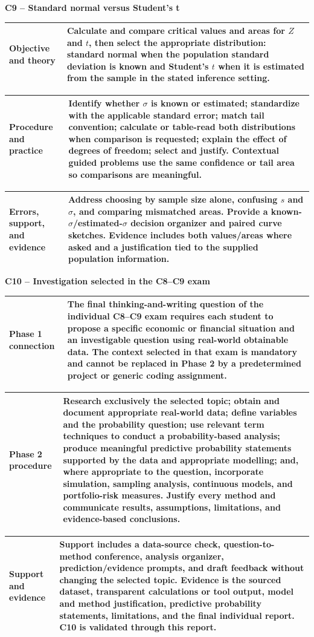 \documentclass[10pt,letterpaper]{article}
\newcommand{\criterionpart}[1]{%
	\Needspace{10\baselineskip}\par\vspace{5pt}%
	\begin{tcolorbox}[
		colback=sectionblue!7,
		colframe=borderblue,
		boxrule=0.8pt,
		sharp corners,
		left=6pt,right=6pt,top=3pt,bottom=3pt,
		before skip=0pt,after skip=2pt]
		\bfseries #1
	\end{tcolorbox}%
}
\newcommand{\labelled}[2]{%
	\noindent
	\begin{tabularx}{\textwidth}{|>{\RaggedRight\arraybackslash\bfseries}p{2.12in}|>{\RaggedRight\arraybackslash}X|}
		\hline
		#1 & #2\\
		\hline
	\end{tabularx}\par\vspace{-\arrayrulewidth}%
}
\begin{document}
\criterionpart{C9 -- Standard normal versus Student's t}
\labelled{Objective and theory}{Calculate and compare critical values and areas for $Z$ and $t$, then select the appropriate distribution: standard normal when the population standard deviation is known and Student's $t$ when it is estimated from the sample in the stated inference setting.}
\labelled{Procedure and practice}{Identify whether $\sigma$ is known or estimated; standardize with the applicable standard error; match tail convention; calculate or table-read both distributions when comparison is requested; explain the effect of degrees of freedom; select and justify. Contextual guided problems use the same confidence or tail area so comparisons are meaningful.}
\labelled{Errors, support, and evidence}{Address choosing by sample size alone, confusing $s$ and $\sigma$, and comparing mismatched areas. Provide a known-$\sigma$/estimated-$\sigma$ decision organizer and paired curve sketches. Evidence includes both values/areas where asked and a justification tied to the supplied population information.}

\criterionpart{C10 -- Investigation selected in the C8--C9 exam}
\labelled{Phase 1 connection}{The final thinking-and-writing question of the individual C8--C9 exam requires each student to propose a specific economic or financial situation and an investigable question using real-world obtainable data. The context selected in that exam is mandatory and cannot be replaced in Phase 2 by a predetermined project or generic coding assignment.}
\labelled{Phase 2 procedure}{Research exclusively the selected topic; obtain and document appropriate real-world data; define variables and the probability question; use relevant term techniques to conduct a probability-based analysis; produce meaningful predictive probability statements supported by the data and appropriate modelling; and, where appropriate to the question, incorporate simulation, sampling analysis, continuous models, and portfolio-risk measures. Justify every method and communicate results, assumptions, limitations, and evidence-based conclusions.}
\labelled{Support and evidence}{Support includes a data-source check, question-to-method conference, analysis organizer, prediction/evidence prompts, and draft feedback without changing the selected topic. Evidence is the sourced dataset, transparent calculations or tool output, model and method justification, predictive probability statements, limitations, and the final individual report. C10 is validated through this report.}
\end{document}
